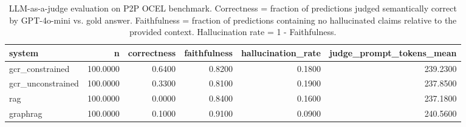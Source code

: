 \begin{table}
\caption{LLM-as-a-judge evaluation on P2P OCEL benchmark. Correctness = fraction of predictions judged semantically correct by GPT-4o-mini vs. gold answer. Faithfulness = fraction of predictions containing no hallucinated claims relative to the provided context. Hallucination rate = 1 - Faithfulness.}
\label{tab:judge_results}
\begin{tabular}{lrrrrr}
\toprule
system & n & correctness & faithfulness & hallucination_rate & judge_prompt_tokens_mean \\
\midrule
gcr_constrained & 100.0000 & 0.6400 & 0.8200 & 0.1800 & 239.2300 \\
gcr_unconstrained & 100.0000 & 0.3300 & 0.8100 & 0.1900 & 237.8500 \\
rag & 100.0000 & 0.0000 & 0.8400 & 0.1600 & 237.1800 \\
graphrag & 100.0000 & 0.1000 & 0.9100 & 0.0900 & 240.5600 \\
\bottomrule
\end{tabular}
\end{table}
